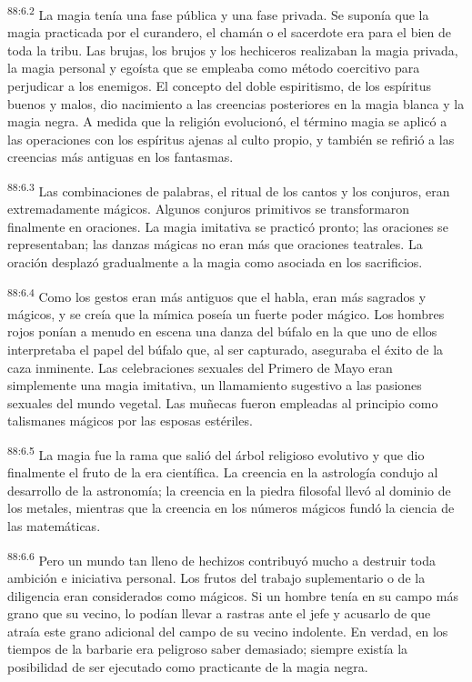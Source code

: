 \documentclass[twoside, 11pt]{book}
\begin{document}
\par
\textsuperscript{88:6.2} La magia tenía una fase pública y una fase privada. Se suponía que la magia practicada por el curandero, el chamán o el sacerdote era para el bien de toda la tribu. Las brujas, los brujos y los hechiceros realizaban la magia privada, la magia personal y egoísta que se empleaba como método coercitivo para perjudicar a los enemigos. El concepto del doble espiritismo, de los espíritus buenos y malos, dio nacimiento a las creencias posteriores en la magia blanca y la magia negra. A medida que la religión evolucionó, el término magia se aplicó a las operaciones con los espíritus ajenas al culto propio, y también se refirió a las creencias más antiguas en los fantasmas.

\par
\textsuperscript{88:6.3} Las combinaciones de palabras, el ritual de los cantos y los conjuros, eran extremadamente mágicos. Algunos conjuros primitivos se transformaron finalmente en oraciones. La magia imitativa se practicó pronto; las oraciones se representaban; las danzas mágicas no eran más que oraciones teatrales. La oración desplazó gradualmente a la magia como asociada en los sacrificios.

\par
\textsuperscript{88:6.4} Como los gestos eran más antiguos que el habla, eran más sagrados y mágicos, y se creía que la mímica poseía un fuerte poder mágico. Los hombres rojos ponían a menudo en escena una danza del búfalo en la que uno de ellos interpretaba el papel del búfalo que, al ser capturado, aseguraba el éxito de la caza inminente. Las celebraciones sexuales del Primero de Mayo eran simplemente una magia imitativa, un llamamiento sugestivo a las pasiones sexuales del mundo vegetal. Las muñecas fueron empleadas al principio como talismanes mágicos por las esposas estériles.

\par
\textsuperscript{88:6.5} La magia fue la rama que salió del árbol religioso evolutivo y que dio finalmente el fruto de la era científica. La creencia en la astrología condujo al desarrollo de la astronomía; la creencia en la piedra filosofal llevó al dominio de los metales, mientras que la creencia en los números mágicos fundó la ciencia de las matemáticas.

\par
\textsuperscript{88:6.6} Pero un mundo tan lleno de hechizos contribuyó mucho a destruir toda ambición e iniciativa personal. Los frutos del trabajo suplementario o de la diligencia eran considerados como mágicos. Si un hombre tenía en su campo más grano que su vecino, lo podían llevar a rastras ante el jefe y acusarlo de que atraía este grano adicional del campo de su vecino indolente. En verdad, en los tiempos de la barbarie era peligroso saber demasiado; siempre existía la posibilidad de ser ejecutado como practicante de la magia negra.
\end{document}
